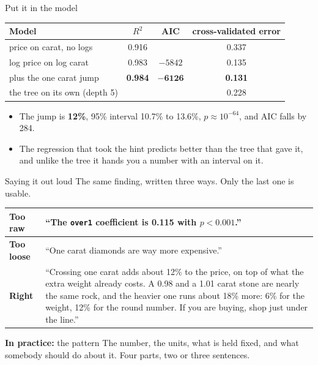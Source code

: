\documentclass[aspectratio=169]{beamer}
\newenvironment{practice}[1]{\begin{exampleblock}{\textbf{In practice:} #1}}{\end{exampleblock}}
\begin{document}
\begin{frame}{Put it in the model}
\begin{center}\small
\begin{tabular}{lccc}
\toprule
\textbf{Model} & \textbf{$R^2$} & \textbf{AIC} & \textbf{cross-validated error} \\
\midrule
price on carat, no logs & 0.916 & & 0.337 \\
log price on log carat & 0.983 & $-5842$ & 0.135 \\
\quad plus the one carat jump & \textbf{0.984} & $\mathbf{-6126}$ & \textbf{0.131} \\
\midrule
the tree on its own (depth 5) & & & 0.228 \\
\bottomrule
\end{tabular}
\end{center}
\begin{itemize}\small
  \item The jump is \textbf{12\%}, 95\% interval 10.7\% to 13.6\%, $p \approx 10^{-64}$, and AIC
        falls by 284.
  \item The regression that took the hint predicts better than the tree that gave it, and unlike
        the tree it hands you a number with an interval on it.
\end{itemize}
\end{frame}

\begin{frame}{Saying it out loud}
The same finding, written three ways. Only the last one is usable.
\begin{center}\small
\begin{tabular}{L{0.16\textwidth} L{0.72\textwidth}}
\toprule
\textbf{Too raw} & ``The \texttt{over1} coefficient is 0.115 with $p < 0.001$.'' \\
\midrule
\textbf{Too loose} & ``One carat diamonds are way more expensive.'' \\
\midrule
\textbf{Right} & ``Crossing one carat adds about 12\% to the price, on top of what the extra
weight already costs. A 0.98 and a 1.01 carat stone are nearly the same rock, and the heavier one
runs about 18\% more: 6\% for the weight, 12\% for the round number. If you are buying, shop
just under the line.'' \\
\bottomrule
\end{tabular}
\end{center}
\vspace{0.2em}
\begin{practice}{the pattern}
The number, the units, what is held fixed, and what somebody should do about it. Four parts, two
or three sentences.
\end{practice}
\end{frame}
\end{document}
